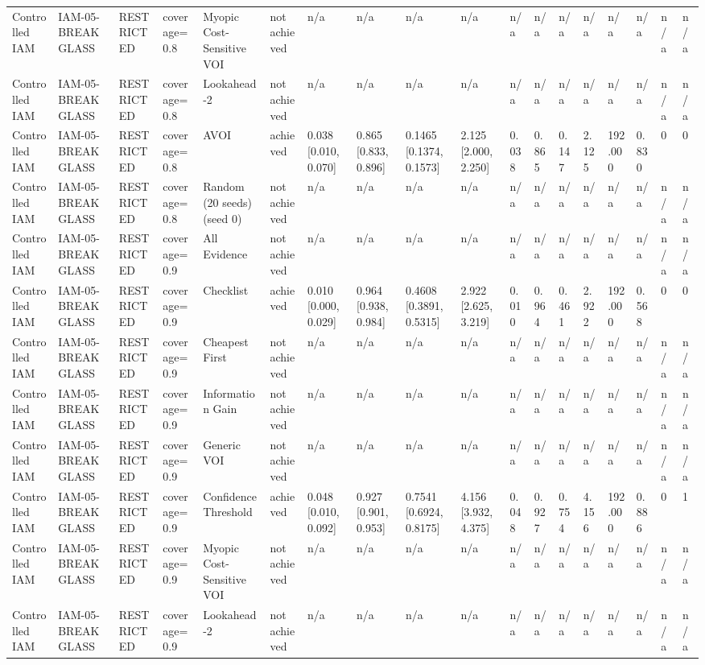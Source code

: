 \begin{table}[!ht]
{\begin{tabular}{llllllllllllllllll}
Controlled IAM & IAM-05-BREAKGLASS & RESTRICTED & coverage=0.8 & Myopic Cost-Sensitive VOI & not achieved & n/a & n/a & n/a & n/a & n/a & n/a & n/a & n/a & n/a & n/a & n/a & n/a \\
Controlled IAM & IAM-05-BREAKGLASS & RESTRICTED & coverage=0.8 & Lookahead-2 & not achieved & n/a & n/a & n/a & n/a & n/a & n/a & n/a & n/a & n/a & n/a & n/a & n/a \\
Controlled IAM & IAM-05-BREAKGLASS & RESTRICTED & coverage=0.8 & AVOI & achieved & 0.038 [0.010, 0.070] & 0.865 [0.833, 0.896] & 0.1465 [0.1374, 0.1573] & 2.125 [2.000, 2.250] & 0.038 & 0.865 & 0.147 & 2.125 & 192.000 & 0.830 & 0 & 0 \\
Controlled IAM & IAM-05-BREAKGLASS & RESTRICTED & coverage=0.8 & Random (20 seeds) (seed 0) & not achieved & n/a & n/a & n/a & n/a & n/a & n/a & n/a & n/a & n/a & n/a & n/a & n/a \\
Controlled IAM & IAM-05-BREAKGLASS & RESTRICTED & coverage=0.9 & All Evidence & not achieved & n/a & n/a & n/a & n/a & n/a & n/a & n/a & n/a & n/a & n/a & n/a & n/a \\
Controlled IAM & IAM-05-BREAKGLASS & RESTRICTED & coverage=0.9 & Checklist & achieved & 0.010 [0.000, 0.029] & 0.964 [0.938, 0.984] & 0.4608 [0.3891, 0.5315] & 2.922 [2.625, 3.219] & 0.010 & 0.964 & 0.461 & 2.922 & 192.000 & 0.568 & 0 & 0 \\
Controlled IAM & IAM-05-BREAKGLASS & RESTRICTED & coverage=0.9 & Cheapest First & not achieved & n/a & n/a & n/a & n/a & n/a & n/a & n/a & n/a & n/a & n/a & n/a & n/a \\
Controlled IAM & IAM-05-BREAKGLASS & RESTRICTED & coverage=0.9 & Information Gain & not achieved & n/a & n/a & n/a & n/a & n/a & n/a & n/a & n/a & n/a & n/a & n/a & n/a \\
Controlled IAM & IAM-05-BREAKGLASS & RESTRICTED & coverage=0.9 & Generic VOI & not achieved & n/a & n/a & n/a & n/a & n/a & n/a & n/a & n/a & n/a & n/a & n/a & n/a \\
Controlled IAM & IAM-05-BREAKGLASS & RESTRICTED & coverage=0.9 & Confidence Threshold & achieved & 0.048 [0.010, 0.092] & 0.927 [0.901, 0.953] & 0.7541 [0.6924, 0.8175] & 4.156 [3.932, 4.375] & 0.048 & 0.927 & 0.754 & 4.156 & 192.000 & 0.886 & 0 & 1 \\
Controlled IAM & IAM-05-BREAKGLASS & RESTRICTED & coverage=0.9 & Myopic Cost-Sensitive VOI & not achieved & n/a & n/a & n/a & n/a & n/a & n/a & n/a & n/a & n/a & n/a & n/a & n/a \\
Controlled IAM & IAM-05-BREAKGLASS & RESTRICTED & coverage=0.9 & Lookahead-2 & not achieved & n/a & n/a & n/a & n/a & n/a & n/a & n/a & n/a & n/a & n/a & n/a & n/a \\

\end{tabular}}
\end{table}

